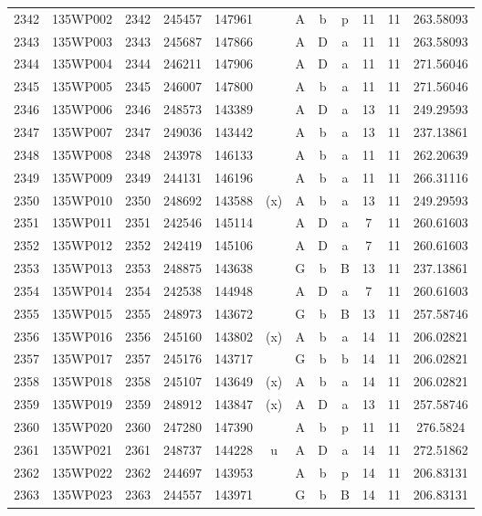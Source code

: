 \begin{tabular}{|*{12}{c|}}
2342 & 135WP002 & 2342 & 245457 & 147961 &  & A & b & p & 11 & 11 & 263.58093 \\ 
2343 & 135WP003 & 2343 & 245687 & 147866 &  & A & D & a & 11 & 11 & 263.58093 \\ 
2344 & 135WP004 & 2344 & 246211 & 147906 &  & A & D & a & 11 & 11 & 271.56046 \\ 
2345 & 135WP005 & 2345 & 246007 & 147800 &  & A & b & a & 11 & 11 & 271.56046 \\ 
2346 & 135WP006 & 2346 & 248573 & 143389 &  & A & D & a & 13 & 11 & 249.29593 \\ 
2347 & 135WP007 & 2347 & 249036 & 143442 &  & A & b & a & 13 & 11 & 237.13861 \\ 
2348 & 135WP008 & 2348 & 243978 & 146133 &  & A & b & a & 11 & 11 & 262.20639 \\ 
2349 & 135WP009 & 2349 & 244131 & 146196 &  & A & b & a & 11 & 11 & 266.31116 \\ 
2350 & 135WP010 & 2350 & 248692 & 143588 & (x) & A & b & a & 13 & 11 & 249.29593 \\ 
2351 & 135WP011 & 2351 & 242546 & 145114 &  & A & D & a & 7 & 11 & 260.61603 \\ 
2352 & 135WP012 & 2352 & 242419 & 145106 &  & A & D & a & 7 & 11 & 260.61603 \\ 
2353 & 135WP013 & 2353 & 248875 & 143638 &  & G & b & B & 13 & 11 & 237.13861 \\ 
2354 & 135WP014 & 2354 & 242538 & 144948 &  & A & D & a & 7 & 11 & 260.61603 \\ 
2355 & 135WP015 & 2355 & 248973 & 143672 &  & G & b & B & 13 & 11 & 257.58746 \\ 
2356 & 135WP016 & 2356 & 245160 & 143802 & (x) & A & b & a & 14 & 11 & 206.02821 \\ 
2357 & 135WP017 & 2357 & 245176 & 143717 &  & G & b & b & 14 & 11 & 206.02821 \\ 
2358 & 135WP018 & 2358 & 245107 & 143649 & (x) & A & b & a & 14 & 11 & 206.02821 \\ 
2359 & 135WP019 & 2359 & 248912 & 143847 & (x) & A & D & a & 13 & 11 & 257.58746 \\ 
2360 & 135WP020 & 2360 & 247280 & 147390 &  & A & b & p & 11 & 11 & 276.5824 \\ 
2361 & 135WP021 & 2361 & 248737 & 144228 & u & A & D & a & 14 & 11 & 272.51862 \\ 
2362 & 135WP022 & 2362 & 244697 & 143953 &  & A & b & p & 14 & 11 & 206.83131 \\ 
2363 & 135WP023 & 2363 & 244557 & 143971 &  & G & b & B & 14 & 11 & 206.83131 \\ 

\end{tabular}
